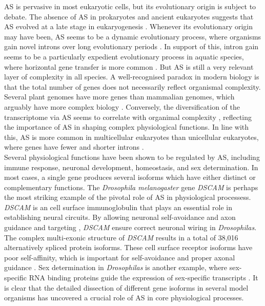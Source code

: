 AS is pervasive in most eukaryotic cells, but its evolutionary origin is subject to debate. The absence of AS in prokaryotes and ancient eukaryotes suggests that AS evolved at a late stage in eukaryogenesis \cite{Koonin2006-eh}. Whenever its evolutionary origin may have been, AS seems to be a dynamic evolutionary process, where organisms gain novel introns over long evolutionary periods \cite{Knowles2006-zy}. In support of this, intron gain seems to be a particularly expedient evolutionary process in aquatic species, where horizontal gene transfer is more common \cite{Gozashti2022-bz}. But AS is still a very relevant layer of complexity in all species. A well-recognised paradox in modern biology is that the total number of genes does not necessarily reflect organismal complexity. Several plant genomes have more genes than mammalian genomes, which arguably have more complex biology \cite{Messing2001-wb}. Conversely, the diversification of the transcriptome via AS seems to correlate with organimal complexity \cite{Bush2017-nz}, reflecting the importance of AS in shaping complex physiological functions. In line with this, AS is more common in multicellular eukaryotes than unicellular eukaryotes, where genes have fewer and shorter introns \cite{Marasco2023-kt}. \\

Several physiological functions have been shown to be regulated by AS, including immune response, neuronal development, homeostasis, and sex determination. In most cases, a single gene produces several isoforms which have either distinct or complementary functions. The \textit{Drosophila melanogaster} gene \textit{DSCAM} is perhaps the most striking example of the pivotal role of AS in physiological processess. \textit{DSCAM} is an cell surface immunoglobulin that plays an essential role in establishing neural circuits. By allowing neuronal self-avoidance and axon guidance and targeting \cite{Hattori2008-jd}, \textit{DSCAM} ensure correct neuronal wiring in \textit{Drosophilas}. The complex multi-exonic structure of \textit{DSCAM} results in a total of 38,016 alternatively spliced protein isoforms. These cell surface receptor isoforms have poor self-affinity, which is important for self-avoidance and proper axonal guidance \cite{Wojtowicz2004-df}. Sex determination in \textit{Drosophilas} is another example, where sex-specific RNA binding proteins guide the expression of sex-specific transcripts \cite{Penalva2003-bu}. It is clear that the detailed dissection of different gene isoforms in several model organisms has uncovered a crucial role of AS in core physiological processes. 

